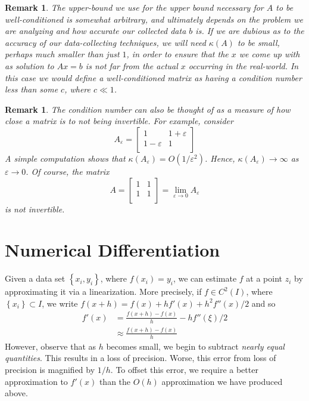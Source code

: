 \documentclass[12pt,reqno]{amsart}
\numberwithin{equation}{section}  %
\newcommand{\ee}{\varepsilon}
\newtheorem{remark}[theorem]{Remark}
\begin{document}
\begin{remark}
The upper-bound we use for the upper bound necessary for $A$ to be well-conditioned
is somewhat arbitrary, and ultimately depends on the problem we are analyzing
and how accurate our collected data $b$ is. If we are dubious as to 
the accuracy of our data-collecting techniques, we will 
need $\kappa(A)$ to be small,
perhaps much smaller than just $1$, in order to
ensure that the $x$ we come up with as solution to $Ax = b$ is not far
from the actual $x$ occurring in the real-world. In this case we would define
a well-conditioned matrix as having a condition number less than some $c$, where
$c \ll 1$. 
\end{remark}
\begin{remark}
The condition number can also be thought of as a measure of how close a matrix
is to not being invertible. For example, consider
\begin{equation*}
A_\ee = 
\begin{bmatrix}
1 & 1+ \ee \\
1 - \ee & 1 \\
\end{bmatrix}
\end{equation*}
A simple computation shows that $\kappa(A_\ee) = O(1/\ee^2)$.
Hence, $\kappa(A_\ee) \to \infty$ as $\ee \to 0$. Of course,
the matrix
\begin{equation*}
A = 
\begin{bmatrix}
1 & 1 \\
1  & 1 \\
\end{bmatrix}
 = \lim_{\ee \to 0} A_\ee
\end{equation*}
is not invertible.
\end{remark}
\section{Numerical Differentiation}
Given a data set $ \left\{ x_i, y_i \right\} $, where $f(x_i) = y_i$, 
we can estimate $f$ at a point $z_i$ by approximating it via a linearization. More
precisely, if $f \in C^2(I)$, where $ \left\{ x_i \right\} \subset I$, we write
$f(x + h) = f(x) + hf'(x) + h^2 f''(x)/2$ and so
\begin{align*}
f'(x) &= \frac{f(x+h) - f(x)}{h} - hf''(\xi)/2 \\
& \approx \frac{f(x+h) - f(x)}{h} 
\end{align*}
However, observe that as $h$ becomes small, we begin to subtract
\emph{nearly equal quantities}. This results in a loss of precision. Worse,
this error from loss of precision is magnified by $1/h$. To offset this error,
we require a better approximation to $f'(x)$ than the $O(h)$ approximation
we have produced above. 
\end{document}
